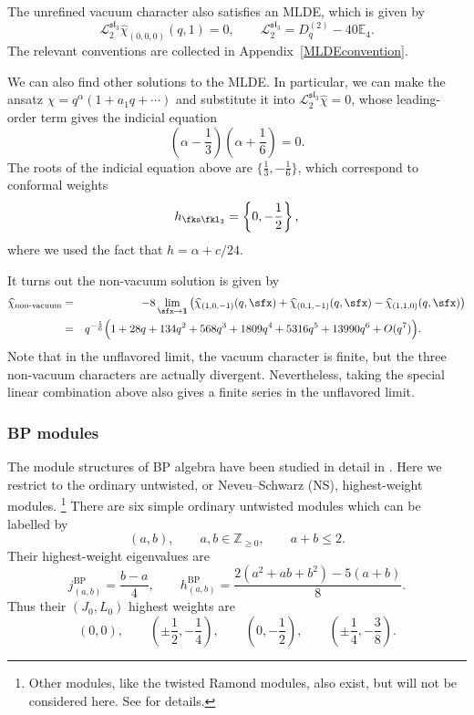 \documentclass[a4paper,11pt]{article}
\theoremstyle{definition}
\theoremstyle{definition}
\theoremstyle{remark}
\newcommand{\be}{\begin{equation}}
\newcommand{\ee}{\end{equation}}
\newcommand{\beqn}{\begin{eqnarray}}
\newcommand{\eeqn}{\end{eqnarray}}
\begin{document}
 The unrefined vacuum character also satisfies an MLDE, which is given  by  \cite{Beem:2017ooy} 
  \be
\mathscr L_2^{\mathfrak{sl}_3}\widehat\chi_{(0,0,0)}(q,1)=0,
\qquad \mathscr L_2^{\mathfrak{sl}_3}=D_q^{(2)}-40\mathbb{E}_4.
\ee 
The relevant conventions are collected in Appendix~\ref{MLDEconvention}. 

We can also  find other solutions to the MLDE. In particular, we can make the ansatz $\widehat\chi=q^\alpha(1+a_1 q+\cdots )$ and substitute it into $\mathscr L_2^{\mathfrak{sl}_3}\widehat\chi=0$, whose leading-order  term gives the indicial equation 
\be
(\alpha-\frac13)(\alpha+\frac16)=0.
\ee
The roots of the indicial equation above are $\{ \frac13, -\frac16 \}$, which correspond  to   
  conformal  weights
\be
h_{  \fks\fkl_3}=\left\{ 0, -\frac12
\right\},
\ee
where we used the fact that $h=\alpha+c/24$. 

It turns out the   non-vacuum solution is given by 
\beqn
\widehat \chi_\text{non-vacuum}&=&
-8   \lim_{\boldsymbol{\sfx} \to \mathbf{1}} \left( \widehat{\chi}_{(1,0,-1)}(q, \boldsymbol{\sfx}) + \widehat{\chi}_{(0,1,-1)}(q, \boldsymbol{\sfx}) - \widehat{\chi}_{(1,1,0)}(q, \boldsymbol{\sfx}) \right)
\\&=&
q^{-\frac16} \Big(1+28q+134q^2+568q^3+1809q^4 +5316q^5+13990q^6
+O(q^7)\Big).\qquad\qquad
\eeqn
   Note that in the unflavored limit,  the   vacuum character is finite, but the   three   non-vacuum characters are actually divergent. Nevertheless, taking the special linear combination above also gives a finite series in the unflavored limit.  

  \subsubsection{BP modules}
  
 
  
  The module structures of BP algebra have been studied in detail   in \cite{FKR2021Review}. 
   Here we restrict to the ordinary untwisted, or Neveu--Schwarz (NS), highest-weight modules.   
   \footnote{Other modules, like the twisted   Ramond modules, also exist, but will not be considered here. See \cite{FKR2021Review} for details. }
There are   six simple ordinary untwisted modules which can be labelled  by
\be 
 (a,b),\qquad a,b\in\mathbb Z_{\geq0},\qquad a+b\leq2.
\ee
Their highest-weight eigenvalues are
\be 
j^{ \text{BP}}_{(a,b)}=\frac{b-a}{4},
\qquad
h^{ \text{BP}}_{(a,b)}
=
\frac{2(a^2+ab+b^2)-5(a+b)}8.
\ee
Thus their $ (J_0,L_0)$ highest weights are
\be\label{jlist}
(0,0),\qquad
\left(\pm\frac12,-\frac14\right),\qquad
\left(0,-\frac12\right),\qquad
\left(\pm\frac14,-\frac38\right).
\ee
 
\end{document}
